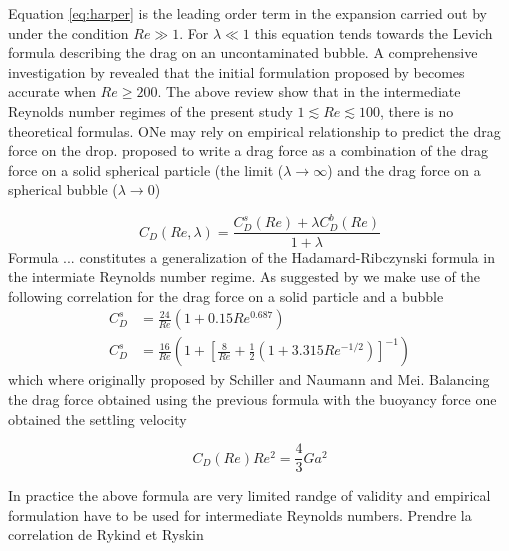 Equation \ref{eq:harper} is the leading order term in the expansion carried out by \citet{harper1968} under the condition $Re\gg 1$. For $\lambda \ll 1$ this equation tends towards the Levich formula describing the drag on an uncontaminated bubble. A comprehensive investigation by \citet{dandy1989} revealed that the initial formulation proposed by \citet{harper1968} becomes accurate when $Re\geq 200$. The above review show that in the intermediate Reynolds number regimes of the present study $ 1 \lesssim Re \lesssim 100$, there is no theoretical formulas. ONe may rely on empirical relationship to predict the drag force on the drop. \citet{rivkind1970} proposed to write a drag force as a combination of the drag force on a solid spherical particle
(the limit ($\lambda \rightarrow \infty$) and the drag force on a spherical bubble ($\lambda \rightarrow 0$)

\begin{equation}
C_D(Re,\lambda) = \frac{C_{D}^s(Re)+\lambda C_{D}^b(Re)}{1+\lambda}
\end{equation}
Formula ... constitutes a generalization of the Hadamard-Ribczynski formula in the intermiate Reynolds number regime. As suggested by \citet{magnaudet1997} we make use of the following correlation for the drag force on a solid particle and a bubble
\begin{align}
C_D ^s &= \frac{24}{Re}(1+0.15Re^{0.687}) \\
C_D ^s &= \frac{16}{Re}\left(1+\left[\frac{8}{Re}+\frac{1}{2}\left(1+3.315Re^{-1/2}\right)\right]^{-1}\right)
\end{align}
which where originally proposed by Schiller and Naumann and Mei. Balancing the drag force obtained using the previous formula with the buoyancy force one obtained the settling velocity

\begin{equation}
C_D(Re)Re^2=\frac{4}{3}Ga ^2
\label{}
\end{equation}





In practice the above formula are very limited randge of validity and empirical formulation have to be used for intermediate Reynolds numbers. Prendre la correlation de Rykind et Ryskin


